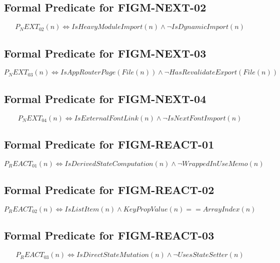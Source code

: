 \subsection{Formal Predicate for FIGM-NEXT-02}
\begin{equation}
P_NEXT_02(n) \iff IsHeavyModuleImport(n) \land \neg IsDynamicImport(n)
\end{equation}

\subsection{Formal Predicate for FIGM-NEXT-03}
\begin{equation}
P_NEXT_03(n) \iff IsAppRouterPage(File(n)) \land \neg HasRevalidateExport(File(n))
\end{equation}

\subsection{Formal Predicate for FIGM-NEXT-04}
\begin{equation}
P_NEXT_04(n) \iff IsExternalFontLink(n) \land \neg IsNextFontImport(n)
\end{equation}

\subsection{Formal Predicate for FIGM-REACT-01}
\begin{equation}
P_REACT_01(n) \iff IsDerivedStateComputation(n) \land \neg WrappedInUseMemo(n)
\end{equation}

\subsection{Formal Predicate for FIGM-REACT-02}
\begin{equation}
P_REACT_02(n) \iff IsListItem(n) \land KeyPropValue(n) == ArrayIndex(n)
\end{equation}

\subsection{Formal Predicate for FIGM-REACT-03}
\begin{equation}
P_REACT_03(n) \iff IsDirectStateMutation(n) \land \neg UsesStateSetter(n)
\end{equation}

